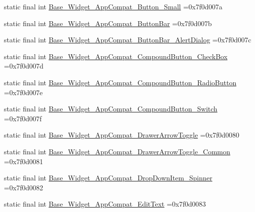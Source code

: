 \begin{DoxyCompactItemize}
static final int \mbox{\hyperlink{classcom_1_1example_1_1trainawearapplication_1_1_r_1_1style_ac39f8b1cf08263420e6370ae9211f190}{Base\+\_\+\+Widget\+\_\+\+App\+Compat\+\_\+\+Button\+\_\+\+Small}} =0x7f0d007a
\item 
static final int \mbox{\hyperlink{classcom_1_1example_1_1trainawearapplication_1_1_r_1_1style_a47999c1d53743f2f6adc5d4008ba0805}{Base\+\_\+\+Widget\+\_\+\+App\+Compat\+\_\+\+Button\+Bar}} =0x7f0d007b
\item 
static final int \mbox{\hyperlink{classcom_1_1example_1_1trainawearapplication_1_1_r_1_1style_a2db373828a5a9b18e2507403f4e76a93}{Base\+\_\+\+Widget\+\_\+\+App\+Compat\+\_\+\+Button\+Bar\+\_\+\+Alert\+Dialog}} =0x7f0d007c
\item 
static final int \mbox{\hyperlink{classcom_1_1example_1_1trainawearapplication_1_1_r_1_1style_a1a3949a584cb75d1f19f3610072aabcc}{Base\+\_\+\+Widget\+\_\+\+App\+Compat\+\_\+\+Compound\+Button\+\_\+\+Check\+Box}} =0x7f0d007d
\item 
static final int \mbox{\hyperlink{classcom_1_1example_1_1trainawearapplication_1_1_r_1_1style_ad83f2d949d796155268f782b05ca2c2e}{Base\+\_\+\+Widget\+\_\+\+App\+Compat\+\_\+\+Compound\+Button\+\_\+\+Radio\+Button}} =0x7f0d007e
\item 
static final int \mbox{\hyperlink{classcom_1_1example_1_1trainawearapplication_1_1_r_1_1style_af12c16234d87a4b87ddbefab4c9037f3}{Base\+\_\+\+Widget\+\_\+\+App\+Compat\+\_\+\+Compound\+Button\+\_\+\+Switch}} =0x7f0d007f
\item 
static final int \mbox{\hyperlink{classcom_1_1example_1_1trainawearapplication_1_1_r_1_1style_a64a6d4be49e4e14122ee146bb2aeb5cb}{Base\+\_\+\+Widget\+\_\+\+App\+Compat\+\_\+\+Drawer\+Arrow\+Toggle}} =0x7f0d0080
\item 
static final int \mbox{\hyperlink{classcom_1_1example_1_1trainawearapplication_1_1_r_1_1style_acf2d9f4c32fd5a5b60abe6c882a841c2}{Base\+\_\+\+Widget\+\_\+\+App\+Compat\+\_\+\+Drawer\+Arrow\+Toggle\+\_\+\+Common}} =0x7f0d0081
\item 
static final int \mbox{\hyperlink{classcom_1_1example_1_1trainawearapplication_1_1_r_1_1style_a7789c9e596629ab01bb6e606cf09fe6a}{Base\+\_\+\+Widget\+\_\+\+App\+Compat\+\_\+\+Drop\+Down\+Item\+\_\+\+Spinner}} =0x7f0d0082
\item 
static final int \mbox{\hyperlink{classcom_1_1example_1_1trainawearapplication_1_1_r_1_1style_a919c417711f0049f587f2a1d2c4fde3c}{Base\+\_\+\+Widget\+\_\+\+App\+Compat\+\_\+\+Edit\+Text}} =0x7f0d0083
\item 

\end{DoxyCompactItemize}
